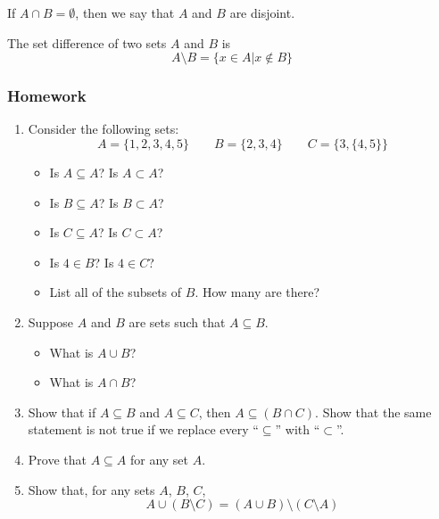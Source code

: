 \documentclass[10pt,a4paper,oneside]{book}
\begin{document}
\begin{definition}
    If $A\cap B = \emptyset$, then we say that $A$ and $B$ are disjoint.
\end{definition}

\begin{definition}
    The set difference of two sets $A$ and $B$ is 
    \[ A\setminus B = \{x \in A | x\notin B\}\]
\end{definition}

\subsubsection*{Homework}

\begin{enumerate}
    \item Consider the following sets:
    \[ A = \{1,2,3,4,5\} \qquad B = \{2,3,4\} \qquad C = \{3,\{4,5\}\}\]
    \begin{itemize}
        \item Is $A\subseteq A$? Is $A\subset A$?
        \item Is $B\subseteq A$? Is $B\subset A$?
        \item Is $C\subseteq A$? Is $C\subset A$?
        \item Is $4\in B$? Is $4\in C$?
        \item List all of the subsets of $B$. How many are there?
    \end{itemize}

    \item Suppose $A$ and $B$ are sets such that $A\subseteq B$.
    \begin{itemize}
        \item What is $A\cup B$?
        \item What is $A\cap B$?
    \end{itemize}

    \item Show that if $A\subseteq B$ and $A\subseteq C$, then $A\subseteq(B\cap C)$. Show that the same statement is not true if we replace every ``$\subseteq$'' with ``$\subset$''.
    
    \item Prove that $A\subseteq A$ for any set $A$.

    \item Show that, for any sets $A$, $B$, $C$,
    \[A\cup (B\setminus C) = (A\cup B)\setminus (C\setminus A)\]
\end{enumerate}
\end{document}
